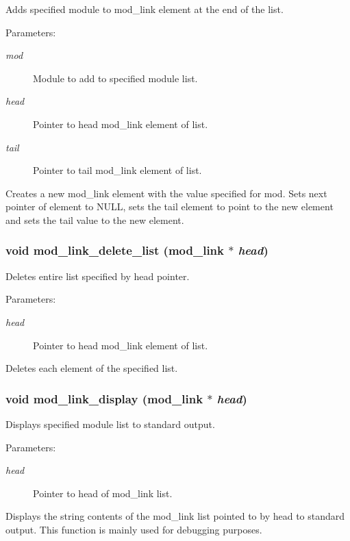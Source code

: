 Adds specified module to mod\_\-link element at the end of the list.

\begin{Desc}
\item[Parameters: ]\par
\begin{description}
\item[{\em 
mod}]Module to add to specified module list. \item[{\em 
head}]Pointer to head mod\_\-link element of list. \item[{\em 
tail}]Pointer to tail mod\_\-link element of list.\end{description}
\end{Desc}
Creates a new mod\_\-link element with the value specified for mod. Sets next pointer of element to NULL, sets the tail element to point to the new element and sets the tail value to the new element. 
\subsubsection{\setlength{\rightskip}{0pt plus 5cm}void mod\_\-link\_\-delete\_\-list ({\bf mod\_\-link} $\ast$ {\em head})}\label{link_8h_a19}


Deletes entire list specified by head pointer.

\begin{Desc}
\item[Parameters: ]\par
\begin{description}
\item[{\em 
head}]Pointer to head mod\_\-link element of list.\end{description}
\end{Desc}
Deletes each element of the specified list. 
\subsubsection{\setlength{\rightskip}{0pt plus 5cm}void mod\_\-link\_\-display ({\bf mod\_\-link} $\ast$ {\em head})}\label{link_8h_a9}


Displays specified module list to standard output.

\begin{Desc}
\item[Parameters: ]\par
\begin{description}
\item[{\em 
head}]Pointer to head of mod\_\-link list.\end{description}
\end{Desc}
Displays the string contents of the mod\_\-link list pointed to by head to standard output. This function is mainly used for debugging purposes. 
